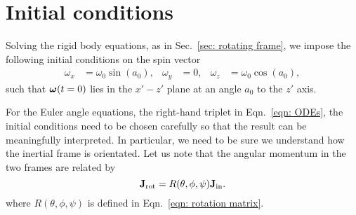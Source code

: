 \documentclass[../full_thesis/full_thesis.tex]{subfiles}
\begin{document}
\section{Initial conditions}
\label{sec: initial conditions}

Solving the rigid body equations, as in Sec.~\ref{sec:
rotating frame}, we impose the following initial conditions on the
spin vector
\begin{align}\label{eqn: spin init}
\omega_{x} & = \omega_{0}\sin(a_{0}), &
\omega_{y} & = 0, &
\omega_{z} & = \omega_{0}\cos(a_{0}),
\end{align}
such that $\boldsymbol{\omega}(t=0)$ lies in the $x' - z'$ plane at an angle $a_{0}$ to the
$z'$ axis.

For the Euler angle equations, the right-hand triplet in Eqn.~\eqref{eqn:
ODEs}, the initial conditions need to be chosen carefully so that the result
can be meaningfully interpreted. In particular, we need to be sure we understand
how the inertial frame is orientated. Let us note that the angular
momentum in the two frames are related by
\begin{equation}
\mathbf{J}_{\textrm{rot}} = R(\theta, \phi, \psi) \mathbf{J}_{\textrm{in}} .
\label{eqn: transform}
\end{equation}
where $R(\theta, \phi, \psi)$ is defined in Eqn.~\eqref{eqn: rotation matrix}.
\end{document}

